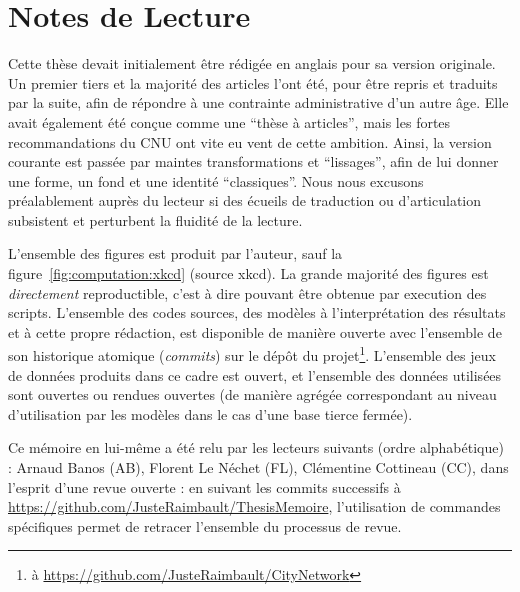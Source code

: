 



\begingroup
\let\clearpage\relax
\let\cleardoublepage\relax
\let\cleardoublepage\relax


\chapter*{Notes de Lecture}



Cette thèse devait initialement être rédigée en anglais pour sa version originale. Un premier tiers et la majorité des articles l'ont été, pour être repris et traduits par la suite, afin de répondre à une contrainte administrative d'un autre âge. Elle avait également été conçue comme une ``thèse à articles'', mais les fortes recommandations du CNU ont vite eu vent de cette ambition. Ainsi, la version courante est passée par maintes transformations et ``lissages'', afin de lui donner une forme, un fond et une identité ``classiques''. Nous nous excusons préalablement auprès du lecteur si des écueils de traduction ou d'articulation subsistent et perturbent la fluidité de la lecture.

L'ensemble des figures est produit par l'auteur, sauf la figure~\ref{fig:computation:xkcd} (source xkcd). La grande majorité des figures est \emph{directement} reproductible, c'est à dire pouvant être obtenue par execution des scripts. L'ensemble des codes sources, des modèles à l'interprétation des résultats et à cette propre rédaction, est disponible de manière ouverte avec l'ensemble de son historique atomique (\emph{commits}) sur le dépôt du projet\footnote{à \url{https://github.com/JusteRaimbault/CityNetwork}}. L'ensemble des jeux de données produits dans ce cadre est ouvert, et l'ensemble des données utilisées sont ouvertes ou rendues ouvertes (de manière agrégée correspondant au niveau d'utilisation par les modèles dans le cas d'une base tierce fermée).

Ce mémoire en lui-même a été relu par les lecteurs suivants (ordre alphabétique) : Arnaud Banos (AB), Florent Le Néchet (FL), Clémentine Cottineau (CC), dans l'esprit d'une revue ouverte : en suivant les commits successifs à \url{https://github.com/JusteRaimbault/ThesisMemoire}, l'utilisation de commandes spécifiques permet de retracer l'ensemble du processus de revue.

